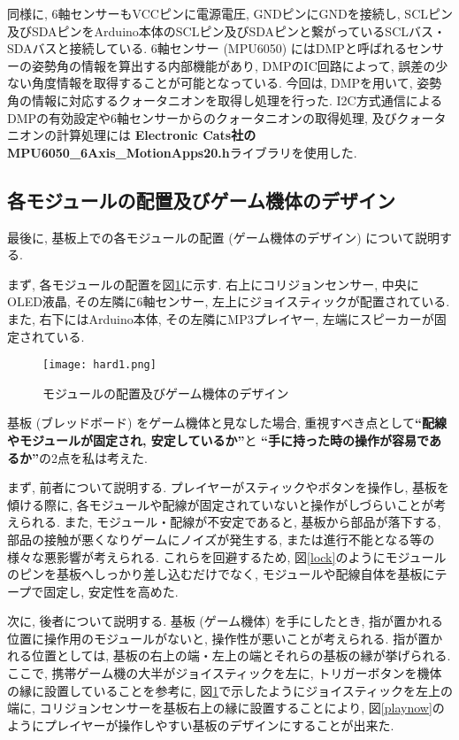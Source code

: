 \documentclass[10pt]{jsarticle}
\begin{document}
同様に, 6軸センサーもVCCピンに電源電圧, GNDピンにGNDを接続し, 
SCLピン及びSDAピンをArduino本体のSCLピン及びSDAピンと繋がっているSCLバス・SDAバスと接続している. 
6軸センサー (MPU6050) にはDMPと呼ばれるセンサーの姿勢角の情報を算出する内部機能があり,
DMPのIC回路によって, 誤差の少ない角度情報を取得することが可能となっている.
今回は, DMPを用いて, 姿勢角の情報に対応するクォータニオンを取得し処理を行った.
I2C方式通信によるDMPの有効設定や6軸センサーからのクォータニオンの取得処理, 及びクォータニオンの計算処理には
\textbf{Electronic Cats社のMPU6050\_6Axis\_MotionApps20.h}ライブラリを使用した.

\subsection{各モジュールの配置及びゲーム機体のデザイン}

最後に, 基板上での各モジュールの配置 (ゲーム機体のデザイン) について説明する.

まず, 各モジュールの配置を図\ref{hard}に示す.
右上にコリジョンセンサー, 中央にOLED液晶, その左隣に6軸センサー, 左上にジョイスティックが配置されている.
また, 右下にはArduino本体, その左隣にMP3プレイヤー, 左端にスピーカーが固定されている.

\begin{figure}[h]
	\centering
	\texttt{[image: hard1.png]}
	\caption{モジュールの配置及びゲーム機体のデザイン}
	\label{hard}
\end{figure}

基板 (ブレッドボード) をゲーム機体と見なした場合, 重視すべき点として\textbf{``配線やモジュールが固定され, 安定しているか''}と
\textbf{``手に持った時の操作が容易であるか''}の2点を私は考えた.

まず, 前者について説明する.
プレイヤーがスティックやボタンを操作し, 基板を傾ける際に, 各モジュールや配線が固定されていないと操作がしづらいことが考えられる.
また, モジュール・配線が不安定であると, 基板から部品が落下する, 部品の接触が悪くなりゲームにノイズが発生する, 
または進行不能となる等の様々な悪影響が考えられる.
これらを回避するため, 図\ref{lock}のようにモジュールのピンを基板へしっかり差し込むだけでなく, 
モジュールや配線自体を基板にテープで固定し, 安定性を高めた.

次に, 後者について説明する.
基板 (ゲーム機体) を手にしたとき, 指が置かれる位置に操作用のモジュールがないと, 操作性が悪いことが考えられる.
指が置かれる位置としては, 基板の右上の端・左上の端とそれらの基板の縁が挙げられる.
ここで, 携帯ゲーム機の大半がジョイスティックを左に, トリガーボタンを機体の縁に設置していることを参考に, 
図\ref{hard}で示したようにジョイスティックを左上の端に, コリジョンセンサーを基板右上の縁に設置することにより, 
図\ref{playnow}のようにプレイヤーが操作しやすい基板のデザインにすることが出来た.
\end{document}
